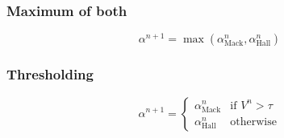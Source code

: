 \documentclass[11pt,a4paper]{article}
\newcommand{\alphamack}{\alpha _{\text{Mack}}}
\newcommand{\alphahall}{\alpha _{\text{Hall}}}
\begin{document}
\subsubsection{Maximum of both}

\begin{equation}
	\alpha ^{n + 1} = \max { \left( \alphamack ^n, \alphahall ^n \right) } 
\end{equation}

\subsubsection{Thresholding}

\begin{equation}
	\alpha ^{n + 1} = \begin{cases}
		\alphamack ^n & \text{if } V^n > \tau \\
		\alphahall ^n & \text{otherwise}
	\end{cases}
\end{equation}
\end{document}
